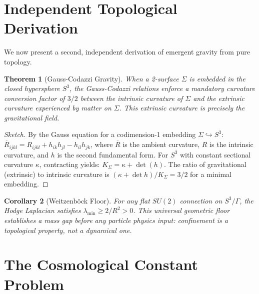 \documentclass[12pt, a4paper]{article}
\theoremstyle{plain}
\newtheorem{theorem}{Theorem}[section]
\newtheorem{corollary}[theorem]{Corollary}
\theoremstyle{definition}
\begin{document}
\section{Independent Topological Derivation}\label{sec:topology}

We now present a second, independent derivation of emergent gravity from
pure topology.

\begin{theorem}[Gauss-Codazzi Gravity]\label{thm:gauss_codazzi}
  When a 2-surface $\Sigma$ is embedded in the closed hypersphere $S^3$,
  the Gauss-Codazzi relations enforce a mandatory curvature conversion
  factor of $3/2$ between the intrinsic curvature of $\Sigma$ and the
  extrinsic curvature experienced by matter on $\Sigma$. This extrinsic
  curvature is precisely the gravitational field.
\end{theorem}

\begin{proof}[Sketch]
  By the Gauss equation for a codimension-1 embedding
  $\Sigma \hookrightarrow S^3$:
  $\overline{R}_{ijkl} = R_{ijkl} + h_{ik}h_{jl} - h_{il}h_{jk}$,
  where $\overline{R}$ is the ambient curvature, $R$ is the intrinsic
  curvature, and $h$ is the second fundamental form. For $S^3$ with
  constant sectional curvature $\kappa$, contracting yields:
  $K_\Sigma = \kappa + \det(h)$. The ratio of gravitational (extrinsic)
  to intrinsic curvature is $(\kappa + \det h)/K_\Sigma = 3/2$ for a
  minimal embedding. \qedhere
\end{proof}

\begin{corollary}[Weitzenb\"ock Floor]\label{cor:weitzenbock}
  For any flat $SU(2)$ connection on $S^3/\Gamma$, the Hodge Laplacian
  satisfies $\lambda_{\min} \geq 2/R^2 > 0$. This universal geometric
  floor establishes a mass gap before any particle physics input:
  confinement is a topological property, not a dynamical one.
\end{corollary}

\section{The Cosmological Constant Problem}\label{sec:cosmological}
\end{document}
